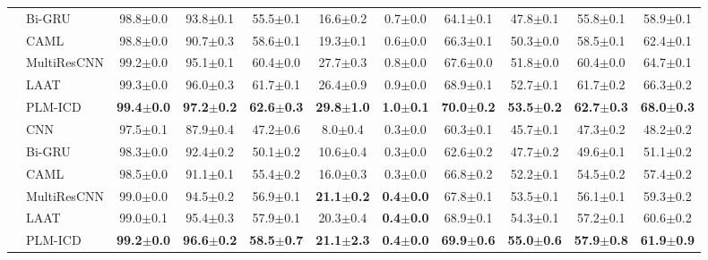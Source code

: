 {\begin{sidewaystable}[t]
{\begin{tabular}{llccccccccc}
        & Bi-GRU  & 98.8$\pm$0.0 & 93.8$\pm$0.1 & 55.5$\pm$0.1 & 16.6$\pm$0.2 & 0.7$\pm$0.0 & 64.1$\pm$0.1 & 47.8$\pm$0.1 & 55.8$\pm$0.1 & 58.9$\pm$0.1 \\
        & CAML & 98.8$\pm$0.0 & 90.7$\pm$0.3 & 58.6$\pm$0.1 & 19.3$\pm$0.1 & 0.6$\pm$0.0 & 66.3$\pm$0.1 & 50.3$\pm$0.0 & 58.5$\pm$0.1 & 62.4$\pm$0.1 \\
        & MultiResCNN  & 99.2$\pm$0.0 & 95.1$\pm$0.1 & 60.4$\pm$0.0 & 27.7$\pm$0.3 & 0.8$\pm$0.0 & 67.6$\pm$0.0 & 51.8$\pm$0.0 & 60.4$\pm$0.0 & 64.7$\pm$0.1 \\
        & LAAT  & 99.3$\pm$0.0 & 96.0$\pm$0.3 & 61.7$\pm$0.1 & 26.4$\pm$0.9 & 0.9$\pm$0.0 & 68.9$\pm$0.1 & 52.7$\pm$0.1 & 61.7$\pm$0.2 & 66.3$\pm$0.2 \\
        & PLM-ICD  & \bfseries 99.4$\pm$0.0 & \bfseries 97.2$\pm$0.2 & \bfseries 62.6$\pm$0.3 & \bfseries 29.8$\pm$1.0 & \bfseries 1.0$\pm$0.1 & \bfseries 70.0$\pm$0.2 & \bfseries 53.5$\pm$0.2 & \bfseries 62.7$\pm$0.3 & \bfseries 68.0$\pm$0.3 \\
        \hline
         & CNN & 97.5$\pm$0.1 & 87.9$\pm$0.4 & 47.2$\pm$0.6 & 8.0$\pm$0.4 & 0.3$\pm$0.0 & 60.3$\pm$0.1 & 45.7$\pm$0.1 & 47.3$\pm$0.2 & 48.2$\pm$0.2 \\
        & Bi-GRU  & 98.3$\pm$0.0 & 92.4$\pm$0.2 & 50.1$\pm$0.2 & 10.6$\pm$0.4 & 0.3$\pm$0.0 & 62.6$\pm$0.2 & 47.7$\pm$0.2 & 49.6$\pm$0.1 & 51.1$\pm$0.2 \\
        & CAML  & 98.5$\pm$0.0 & 91.1$\pm$0.1 & 55.4$\pm$0.2 & 16.0$\pm$0.3 & 0.3$\pm$0.0 & 66.8$\pm$0.2 & 52.2$\pm$0.1 & 54.5$\pm$0.2 & 57.4$\pm$0.2 \\
        & MultiResCNN  & 99.0$\pm$0.0 & 94.5$\pm$0.2 & 56.9$\pm$0.1 & \bfseries 21.1$\pm$0.2 & \bfseries 0.4$\pm$0.0 & 67.8$\pm$0.1 & 53.5$\pm$0.1 & 56.1$\pm$0.1 & 59.3$\pm$0.2 \\
        & LAAT  & 99.0$\pm$0.1 & 95.4$\pm$0.3 & 57.9$\pm$0.1 & 20.3$\pm$0.4 & \bfseries 0.4$\pm$0.0 & 68.9$\pm$0.1 & 54.3$\pm$0.1 & 57.2$\pm$0.1 & 60.6$\pm$0.2 \\
        & PLM-ICD   & \bfseries 99.2$\pm$0.0 & \bfseries 96.6$\pm$0.2 & \bfseries 58.5$\pm$0.7 & \bfseries 21.1$\pm$2.3 & \bfseries 0.4$\pm$0.0 & \bfseries 69.9$\pm$0.6 & \bfseries 55.0$\pm$0.6 & \bfseries 57.9$\pm$0.8 & \bfseries 61.9$\pm$0.9 \\
        
        \bottomrule
    \end{tabular}%
    }
\end{sidewaystable}

}
